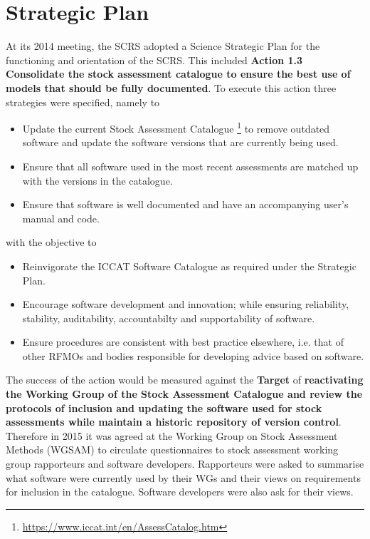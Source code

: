 \documentclass[a4paper,10pt]{article}
\begin{document}
\section*{Strategic Plan}

At its 2014 meeting, the SCRS adopted a Science Strategic Plan for the functioning and orientation of the SCRS. This included \textbf{Action 1.3 Consolidate the stock assessment catalogue to ensure the best use of models that should be fully documented}. To execute this action three strategies were specified, namely to

\begin{itemize}
 \item  Update the current Stock Assessment Catalogue \footnote{\url{https://www.iccat.int/en/AssessCatalog.htm}} to remove outdated software and update the software versions that are currently being used. 
 \item Ensure that all software used in the most recent assessments are matched up with the versions in the catalogue.
 \item Ensure that software is well documented and have an accompanying user’s manual and code.
\end{itemize}

with the objective to
\begin{itemize}
 \item Reinvigorate the ICCAT Software Catalogue as required under the Strategic Plan. 
  \item Encourage software development and innovation; while ensuring reliability, stability, auditability, accountabilty and supportability of software. 
  \item Ensure procedures are consistent with best practice elsewhere, i.e. that of other RFMOs and bodies responsible for developing advice based on software.
\end{itemize}

The success of the action would be measured against the \textbf{Target} of \textbf{reactivating the Working Group of the Stock Assessment Catalogue and review the protocols of inclusion and updating the software used for stock assessments while maintain a historic repository of version control}. Therefore in 2015 it was agreed at the Working Group on Stock Assessment Methods (WGSAM) to circulate questionnaires to stock assessment working group rapporteurs and software developers. Rapporteurs were asked to summarise what software were currently used by their WGs and their views on requirements for inclusion in the catalogue. Software developers were also ask for their views.   
\end{document}
